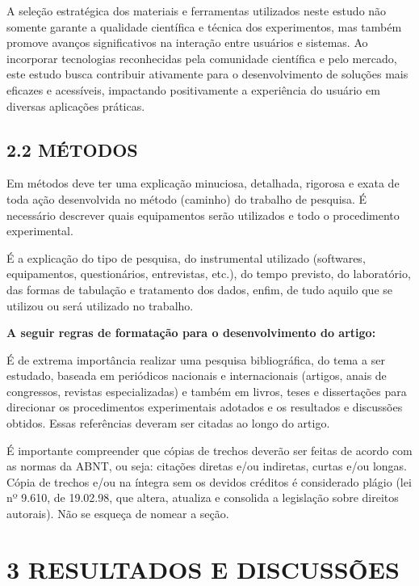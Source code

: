 \documentclass[
]{article}
\begin{document}
A seleção estratégica dos materiais e ferramentas utilizados neste
estudo não somente garante a qualidade científica e técnica dos
experimentos, mas também promove avanços significativos na interação
entre usuários e sistemas. Ao incorporar tecnologias reconhecidas pela
comunidade científica e pelo mercado, este estudo busca contribuir
ativamente para o desenvolvimento de soluções mais eficazes e
acessíveis, impactando positivamente a experiência do usuário em
diversas aplicações práticas.

\subsection{2.2 MÉTODOS}\label{muxe9todos}

Em métodos deve ter uma explicação minuciosa, detalhada, rigorosa e
exata de toda ação desenvolvida no método (caminho) do trabalho de
pesquisa. É necessário descrever quais equipamentos serão utilizados e
todo o procedimento experimental.

É a explicação do tipo de pesquisa, do instrumental utilizado
(softwares, equipamentos, questionários, entrevistas, etc.), do tempo
previsto, do laboratório, das formas de tabulação e tratamento dos
dados, enfim, de tudo aquilo que se utilizou ou será utilizado no
trabalho.

\textbf{A seguir regras de formatação para o desenvolvimento do artigo:}

É de extrema importância realizar uma pesquisa bibliográfica, do tema a
ser estudado, baseada em periódicos nacionais e internacionais (artigos,
anais de congressos, revistas especializadas) e também em livros, teses
e dissertações para direcionar os procedimentos experimentais adotados e
os resultados e discussões obtidos. Essas referências deveram ser
citadas ao longo do artigo.

É importante compreender que cópias de trechos deverão ser feitas de
acordo com as normas da ABNT, ou seja: citações diretas e/ou indiretas,
curtas e/ou longas. Cópia de trechos e/ou na íntegra sem os devidos
créditos é considerado plágio (lei nº 9.610, de 19.02.98, que altera,
atualiza e consolida a legislação sobre direitos autorais). Não se
esqueça de nomear a seção.

\section{3 RESULTADOS E DISCUSSÕES}\label{resultados-e-discussuxf5es}
\end{document}
